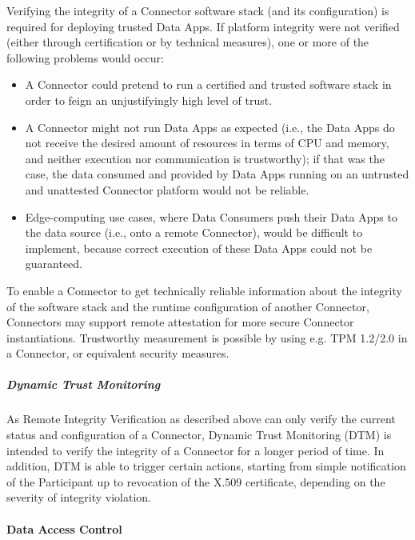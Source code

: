 Verifying the integrity of a Connector software stack (and its configuration) is required for deploying trusted Data Apps. If platform integrity were not verified (either through certification or by technical measures), one or more of the following problems would occur:

\begin{itemize}
	\item A Connector could pretend to run a certified and trusted software stack in order to feign an unjustifyingly high level of trust.

	\item A Connector might not run Data Apps as expected (i.e., the Data Apps do not receive the desired amount of resources in terms of CPU and memory, and neither execution nor communication is trustworthy); if that was the case, the data consumed and provided by Data Apps running on an untrusted and unattested Connector platform would not be reliable.

	\item Edge-computing use cases, where Data Consumers push their Data Apps to the data source (i.e., onto a remote Connector), would be difficult to implement, because correct execution of these Data Apps could not be guaranteed.
\end{itemize}

To enable a Connector to get technically reliable information about the integrity of the software stack and the runtime configuration of another Connector, Connectors may support remote attestation for more secure Connector instantiations. Trustworthy measurement is possible by using e.g. TPM 1.2/2.0 in a Connector, or equivalent security measures.

\subparagraph*{Dynamic Trust Monitoring \\}
As Remote Integrity Verification as described above can only verify the current status and configuration of a Connector, Dynamic Trust Monitoring (DTM) is intended to verify the integrity of a Connector for a longer period of time. In addition, DTM is able to trigger certain actions, starting from simple notification of the Participant up to revocation of the X.509 certificate, depending on the severity of integrity violation.  

\paragraph*{Data Access Control \\}

